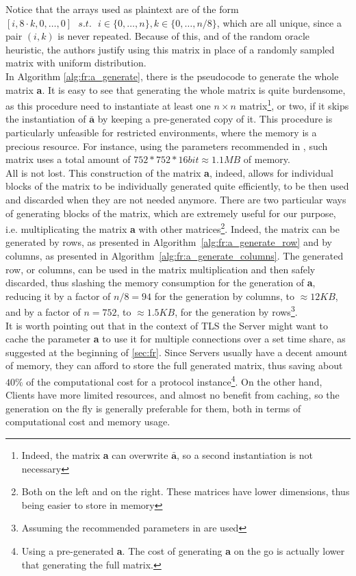 Notice that the arrays used as plaintext are of the form $[i,8\cdot k,0,\dots,0]\text{ }s.t.\text{ }i\in\{0,\dots,n\},k\in\{0,\dots,n/8\}$, which are all unique, since a pair $(i,k)$ is never repeated. Because of this, and of the random oracle heuristic, the authors justify using this matrix in place of a randomly sampled matrix with uniform distribution.\\
In Algorithm \ref{alg:fr:a_generate}, there is the pseudocode to generate the whole matrix \textbf{a}. It is easy to see that generating the whole matrix is quite burdensome, as this procedure need to instantiate at least one $n\times n$ matrix\footnote{Indeed, the matrix \textbf{a} can overwrite $\bar{\textbf{a}}$, so a second instantiation is not necessary}, or two, if it skips the instantiation of $\bar{\textbf{a}}$ by keeping a pre-generated copy of it. This procedure is particularly unfeasible for restricted environments, where the memory is a precious resource. For instance, using the parameters recommended in \cite{frodo}, such matrix uses a total amount of $752*752*16bit\approx1.1MB$ of memory.\\
All is not lost. This construction of the matrix \textbf{a}, indeed, allows for individual blocks of the matrix to be individually generated quite efficiently, to be then used and discarded when they are not needed anymore. There are two particular ways of generating blocks of the matrix, which are extremely useful for our purpose, i.e. multiplicating the matrix \textbf{a} with other matrices\footnote{Both on the left and on the right. These matrices have lower dimensions, thus being easier to store in memory}. Indeed, the matrix can be generated by rows, as presented in \mbox{Algorithm \ref{alg:fr:a_generate_row}} and by columns, as presented in \mbox{Algorithm \ref{alg:fr:a_generate_columns}}. The generated row, or columns, can be used in the matrix multiplication and then safely discarded, thus slashing the memory consumption for the generation of \textbf{a}, reducing it by a factor of $n/8=94$ for the generation by columns, to $\approx 12KB$, and by a factor of $n=752$, to $\approx 1.5KB$, for the generation by rows\footnote{Assuming the recommended parameters in \cite{frodo} are used}.\\
It is worth pointing out that in the context of TLS the Server might want to cache the parameter \textbf{a} to use it for multiple connections over a set time share, as suggested at the beginning of \ref{sec:fr}. Since Servers usually have a decent amount of memory, they can afford to store the full generated matrix, thus saving about $40\%$ of the computational cost for a protocol instance\footnote{Using a pre-generated \textbf{a}. The cost of generating \textbf{a} on the go is actually lower that generating the full matrix.}. On the other hand, Clients have more limited resources, and almost no benefit from caching, so the generation on the fly is generally preferable for them, both in terms of computational cost and memory usage.

